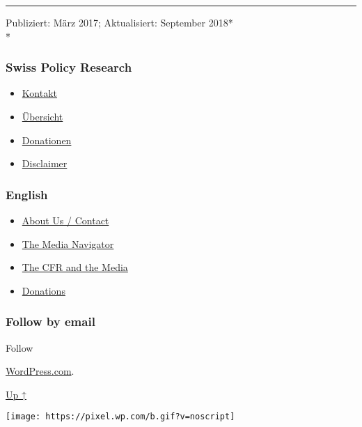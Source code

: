 \begin{center}\rule{0.5\linewidth}{\linethickness}\end{center}

Publiziert: März 2017; Aktualisiert: September 2018*\\
*

\hypertarget{swiss-policy-research}{%
\subsubsection{Swiss Policy Research}\label{swiss-policy-research}}

\begin{itemize}
\tightlist
\item
  \href{https://swprs.org/kontakt/}{Kontakt}
\item
  \href{https://swprs.org/uebersicht/}{Übersicht}
\item
  \href{https://swprs.org/donationen/}{Donationen}
\item
  \href{https://swprs.org/disclaimer/}{Disclaimer}
\end{itemize}

\hypertarget{english}{%
\subsubsection{English}\label{english}}

\begin{itemize}
\tightlist
\item
  \href{https://swprs.org/contact/}{About Us / Contact}
\item
  \href{https://swprs.org/media-navigator/}{The Media Navigator}
\item
  \href{https://swprs.org/the-american-empire-and-its-media/}{The CFR
  and the Media}
\item
  \href{https://swprs.org/donations/}{Donations}
\end{itemize}

\hypertarget{follow-by-email}{%
\subsubsection{Follow by email}\label{follow-by-email}}

Follow

\href{https://wordpress.com/?ref=footer_custom_com}{WordPress.com}.

\protect\hyperlink{}{Up ↑}

\texttt{[image: https://pixel.wp.com/b.gif?v=noscript]}
